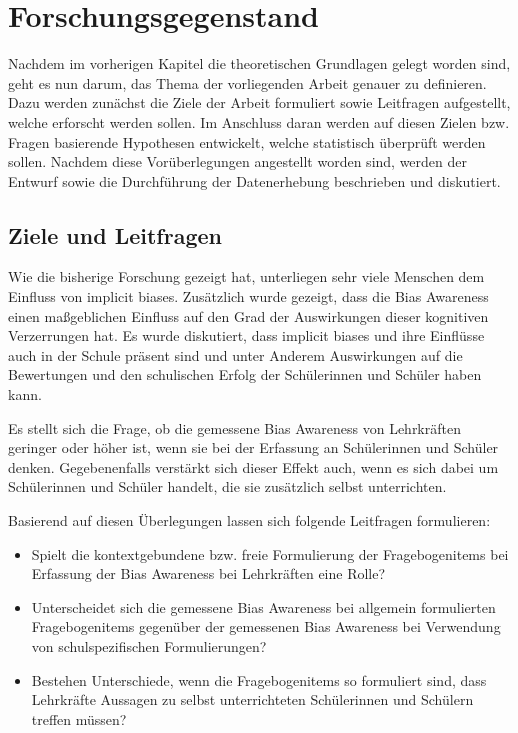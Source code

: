 \chapter{Forschungsgegenstand}
\label{ch:forschungsgegenstand}

Nachdem im vorherigen Kapitel die theoretischen Grundlagen gelegt worden sind, geht es nun darum, das Thema der vorliegenden Arbeit genauer zu definieren.
Dazu werden zunächst die Ziele der Arbeit formuliert sowie Leitfragen aufgestellt, welche erforscht werden sollen.
Im Anschluss daran werden auf diesen Zielen bzw. Fragen basierende Hypothesen entwickelt, welche statistisch überprüft werden sollen.
Nachdem diese Vorüberlegungen angestellt worden sind, werden der Entwurf sowie die Durchführung der Datenerhebung beschrieben und diskutiert.


\section{Ziele und Leitfragen}
\label{sec:leitfragen}

Wie die bisherige Forschung gezeigt hat, unterliegen sehr viele Menschen dem Einfluss von implicit biases.
Zusätzlich wurde gezeigt, dass die Bias Awareness einen maßgeblichen Einfluss auf den Grad der Auswirkungen dieser kognitiven Verzerrungen hat.
Es wurde diskutiert, dass implicit biases und ihre Einflüsse auch in der Schule präsent sind und unter Anderem Auswirkungen auf die Bewertungen und den schulischen Erfolg der Schülerinnen und Schüler haben kann.

Es stellt sich die Frage, ob die gemessene Bias Awareness von Lehrkräften geringer oder höher ist, wenn sie bei der Erfassung an Schülerinnen und Schüler denken.
Gegebenenfalls verstärkt sich dieser Effekt auch, wenn es sich dabei um Schülerinnen und Schüler handelt, die sie zusätzlich selbst unterrichten.

Basierend auf diesen Überlegungen lassen sich folgende Leitfragen formulieren:

\begin{itemize}
	\item Spielt die kontextgebundene bzw. freie Formulierung der Fragebogenitems bei Erfassung der Bias Awareness bei Lehrkräften eine Rolle?
	\item Unterscheidet sich die gemessene Bias Awareness bei allgemein formulierten Fragebogenitems gegenüber der gemessenen Bias Awareness bei Verwendung von schulspezifischen Formulierungen?
	\item Bestehen Unterschiede, wenn die Fragebogenitems so formuliert sind, dass Lehrkräfte Aussagen zu selbst unterrichteten Schülerinnen und Schülern treffen müssen?
\end{itemize}

